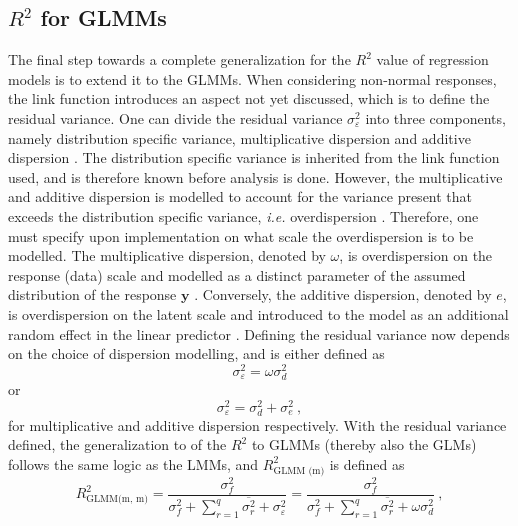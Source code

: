 \subsection{\texorpdfstring{$R^2$}{Lg} for GLMMs}
\label{sec:R2GLMM}
The final step towards a complete generalization for the $R^2$ value of regression models is to extend it to the GLMMs. 
When considering non-normal responses, the link function introduces an aspect not yet discussed, which is to define the residual variance.
One can divide the residual variance $\sigma^2_{\varepsilon}$ into three components, namely distribution specific variance, multiplicative dispersion and additive dispersion \citep{nakagawa2013general}.
The distribution specific variance is inherited from the link function used, and is therefore known before analysis is done. 
However, the multiplicative and additive dispersion is modelled to account for the variance present that exceeds the distribution specific variance, \textit{i.e.} overdispersion \citep{NakagawaSchielzeth2010}.
Therefore, one must specify upon implementation on what scale the overdispersion is to be modelled. 
The multiplicative dispersion, denoted by $\omega$, is overdispersion on the response (data) scale and modelled as a distinct parameter of the assumed distribution of the response $\mathbf{y}$ \citep{NakagawaSchielzeth2010}.
Conversely, the additive dispersion, denoted by $e$, is overdispersion on the latent scale and introduced to the model as an additional random effect in the linear predictor \citep{NakagawaSchielzeth2010}.
Defining the residual variance now depends on the choice of dispersion modelling, and is either defined as
\begin{equation}
    \sigma^2_{\varepsilon} = \omega \sigma^2_{d} 
\end{equation}
or 
\begin{equation}
    \sigma^2_{\varepsilon} = \sigma^2_{d} + \sigma^2_{e} \ ,
\end{equation}
for multiplicative and additive dispersion respectively.
With the residual variance defined, the generalization to of the $R^2$ to GLMMs (thereby also the GLMs) follows the same logic as the LMMs, and $R^2_{\text{GLMM (m)}}$ is defined as
\begin{equation}
    \label{eq:R2_GLMM_m_m}
    R^2_{\text{GLMM(m, m)}} = \frac{\sigma^2_f}{\sigma^2_f + \sum_{r=1}^{q}\overline{\sigma^2_{r}} + \sigma^2_{\varepsilon}} = \frac{\sigma^2_f}{\sigma^2_f + \sum_{r=1}^{q}\overline{\sigma^2_{r}} + \omega \sigma^2_{d}}\ ,
\end{equation}
